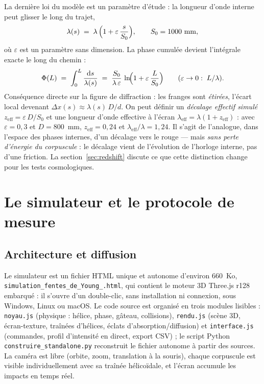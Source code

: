 \documentclass[11pt,a4paper]{article}
\newcommand{\dx}{\Delta x}
\newcommand{\fichierstandalone}{\texttt{simulation\_\allowbreak fentes\_\allowbreak de\_\allowbreak Young\_\allowbreak .html}}
\begin{document}
La dernière loi du modèle est un paramètre d'étude : la longueur d'onde interne
peut glisser le long du trajet,
\begin{equation}\label{eq:lambdas}
  \lambda(s) \;=\; \lambda\,\Bigl(1 + \varepsilon\,\frac{s}{S_0}\Bigr),
  \qquad S_0 = 1000~\mathrm{mm},
\end{equation}
où $\varepsilon$ est un paramètre sans dimension. La phase cumulée devient
l'intégrale exacte le long du chemin :
\begin{equation}\label{eq:phaseL}
  \Phi(L) \;=\; \int_0^L \frac{\mathrm{d}s}{\lambda(s)}
  \;=\; \frac{S_0}{\lambda\,\varepsilon}\,
  \ln\!\Bigl(1 + \varepsilon\,\frac{L}{S_0}\Bigr)
  \qquad (\varepsilon \to 0 : \; L/\lambda).
\end{equation}
Conséquence directe sur la figure de diffraction : les franges sont \emph{étirées},
l'écart local devenant $\dx(s) \approx \lambda(s)\,D/d$. On peut définir un
\emph{décalage effectif simulé} $z_{\mathrm{eff}} = \varepsilon\,D/S_0$ et une
longueur d'onde effective à l'écran $\lambda_{\mathrm{eff}} = \lambda(1 +
z_{\mathrm{eff}})$ : avec $\varepsilon = 0{,}3$ et $D = 800$~mm, $z_{\mathrm{eff}}
= 0{,}24$ et $\lambda_{\mathrm{eff}}/\lambda = 1{,}24$. Il s'agit de l'analogue,
dans l'espace des phases internes, d'un décalage vers le rouge --- mais
\emph{sans perte d'énergie du corpuscule} : le décalage vient de l'évolution de
l'horloge interne, pas d'une friction. La section~\ref{sec:redshift} discute ce que
cette distinction change pour les tests cosmologiques.

\section{Le simulateur et le protocole de mesure}\label{sec:sim}

\subsection{Architecture et diffusion}

Le simulateur est un fichier HTML unique et autonome d'environ $660$~Ko,
\fichierstandalone, qui contient le moteur 3D Three.js
r128 embarqué : il s'ouvre d'un double-clic, sans installation ni connexion, sous
Windows, Linux ou macOS. Le code source est organisé en trois modules
lisibles : \texttt{noyau.js} (physique : hélice, phase, gâteau, collisions),
\texttt{rendu.js} (scène 3D, écran-texture, traînées d'hélices, éclats
d'absorption/diffusion) et \texttt{interface.js} (commandes, profil d'intensité
en direct, export CSV) ; le script Python \texttt{construire\_standalone.py}
reconstruit le fichier autonome à partir des sources. La caméra est libre (orbite,
zoom, translation à la souris), chaque corpuscule est visible individuellement
avec sa traînée hélicoïdale, et l'écran accumule les impacts en temps réel.
\end{document}
